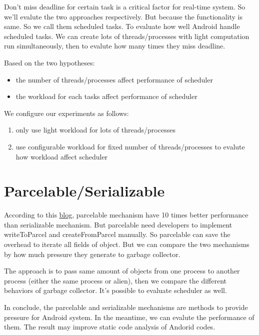 \documentclass[11pt]{article}
\begin{document}
Don't miss deadline for certain task is a critical factor for real-time system.
So we'll evalute the two approaches respectively.
But because the functionality is same.
So we call them scheduled tasks.
To evaluate how well Android handle scheduled tasks.
We can create lots of threads/processes with light computation run simultaneously,
then to evalute how many times they miss deadline.

Based on the two hypotheses:
\begin{itemize}
\item the number of threads/processes affect performance of scheduler
\item the workload for each tasks affect performance of scheduler
\end{itemize}

We configure our experiments as follows:
\begin{enumerate}
\item only use light workload for lots of threads/processes
\item use configurable workload for fixed number of threads/processes to evalute how workload affect scheduler
\end{enumerate}

\section{\label{Parcelable/Serializable}Parcelable/Serializable}
\label{sec-7}
According to this \href{http://www.developerphil.com/parcelable-vs-serializable/}{blog}, parcelable mechanism have 10 times better performance than serializable mechanism.
But parcelable need developers to implement writeToParcel and createFromParcel manually.
So parcelable can save the overhead to iterate all fields of object.
But we can compare the two mechanisms by how much pressure they generate to garbage collector.

The approach is to pass same amount of objects from one process to another process (either the same process or alien),
then we compare the different behaviors of garbage collector.
It's possible to evaluate scheduler as well.

In conclude, the parcelable and serializable mechanisms are methods to provide pressure for Android system.
In the meantime, we can evalute the performance of them.
The result may improve static code analysis of Andorid codes.
\end{document}
